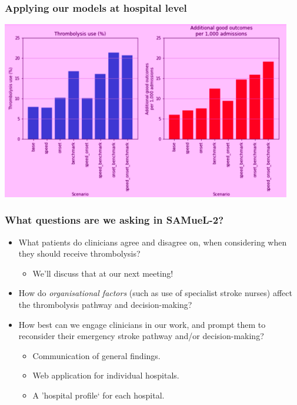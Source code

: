 \documentclass{beamer}
\begin{document}

\begin{frame}
\frametitle{Applying our models at hospital level}

\begin{center}
\includegraphics[width=0.95\textwidth]{./images/hosp_scenario_1}
\end{center}

\end{frame}


\begin{frame}
\frametitle{What questions are we asking in SAMueL-2?}
\begin{itemize}
    \setlength\itemsep{5mm}
    \item What patients do clinicians agree and disagree on, when considering when they should receive thrombolysis?
        \begin{itemize}
        \item We'll discuss that at our next meeting!
    \end{itemize}
    \item How do \emph{organisational factors} (such as use of specialist stroke nurses) affect the thrombolysis pathway and decision-making?

    \item How best can we engage clinicians in our work, and prompt them to reconsider their emergency stroke pathway and/or decision-making?
    
    \begin{itemize}
        \item Communication of general findings.
        \item Web application for individual hospitals.
        \item A 'hospital profile` for each hospital.
    \end{itemize}
\end{itemize}

\end{frame}

\end{document}
